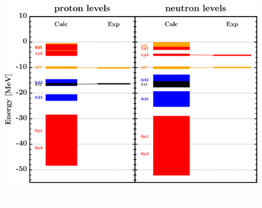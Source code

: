 \documentclass[twocolumn,secnumarabic,amssymb, nobibnotes, aps, prl,
superscriptaddress, nobalancelastpage, draft]{revtex4}
\begin{document}
\begin{figure}[!htb]
\begin{minipage}{0.4\linewidth}
        \label{DOM_ca48_chargeDensity}
    \end{minipage}
    \begin{minipage}{0.35\linewidth}
        \centering
        \includegraphics[width=\linewidth]{figures/ca48_SPLevels.png}
        \label{DOM_ca48_SPLevels}
    \end{minipage}
    \begin{minipage}{0.4\linewidth}
        \centering
        \includegraphics[width=\linewidth]{figures/ca48_RMSRadius.png}

\end{minipage}
\end{figure}
\end{document}
